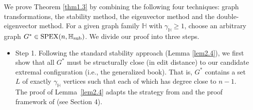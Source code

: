 \documentclass[11pt, a4paper]{article}
\theoremstyle{definition}
\newcommand{\<}{\subseteq}
\begin{document}
We prove Theorem \ref{thm1.3} by combining the following four techniques: graph transformations, the stability method, the eigenvector method and the double-eigenvector method. For a given graph family $\mathbb{H}$ with $\gamma_{\mathbb{H}}\geq 1$, choose an arbitrary graph $G^* \in {\rm SPEX}(n,\mathbb{H}_{\rm sub})$.  We  divide our proof into three steps. 

\begin{itemize}
    \item Step 1. Following the standard stability approach (Lemma \ref{lem2.4}), we first show that all $G^*$ must be structurally close (in edit distance) to our candidate extremal configuration 
(i.e., the generalized book). That is,  $G^*$ contains a set $L$ of exactly $\gamma_\mathbb{H}$ vertices such that each of which has degree close to $n-1$. The proof of Lemma~\ref{lem2.4} adapts the strategy from \cite{zhai} and the proof framework of \cite{byrne2024general} (see Section 4). %


\end{itemize}
\end{document}
